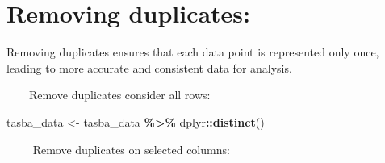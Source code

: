 \documentclass[
]{book}
\newenvironment{Shaded}{\begin{snugshade}}{\end{snugshade}}
\newcommand{\FunctionTok}[1]{\textcolor[rgb]{0.13,0.29,0.53}{\textbf{#1}}}
\newcommand{\NormalTok}[1]{#1}
\newcommand{\OtherTok}[1]{\textcolor[rgb]{0.56,0.35,0.01}{#1}}
\newcommand{\SpecialCharTok}[1]{\textcolor[rgb]{0.81,0.36,0.00}{\textbf{#1}}}
\begin{document}
\hypertarget{removing-duplicates}{%
\section{\texorpdfstring{Removing duplicates:\\
}{Removing duplicates: }}\label{removing-duplicates}}

Removing duplicates ensures that each data point is represented only once, leading to more accurate and consistent data for analysis.

~~~~Remove duplicates consider all rows:

\begin{Shaded}
\begin{Highlighting}[]
\NormalTok{tasba\_data }\OtherTok{\textless{}{-}}\NormalTok{ tasba\_data }\SpecialCharTok{\%\textgreater{}\%} 
\NormalTok{  dplyr}\SpecialCharTok{::}\FunctionTok{distinct}\NormalTok{()}
\end{Highlighting}
\end{Shaded}

~~~~ Remove duplicates on selected columns:
\end{document}
